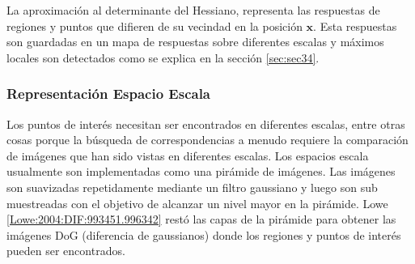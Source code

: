 


La aproximación al determinante del Hessiano, representa las respuestas de regiones y puntos que difieren de su vecindad en la posición $\mathbf{x}$. Esta respuestas son guardadas en un mapa de respuestas sobre diferentes escalas y máximos locales son detectados como se explica en la sección \ref{sec:sec34}.
% 

\subsubsection{Representación Espacio Escala}
\label{sec:section33}
Los puntos de interés necesitan ser encontrados en diferentes escalas, entre otras cosas porque la búsqueda de correspondencias a menudo requiere la comparación de imágenes que han sido vistas en diferentes escalas. Los espacios escala usualmente son implementadas como una pirámide de imágenes. Las imágenes son suavizadas repetidamente mediante un filtro gaussiano y luego son sub muestreadas con el objetivo de alcanzar un nivel mayor en la pirámide. Lowe \ref{Lowe:2004:DIF:993451.996342} restó las capas de la pirámide para obtener las imágenes DoG (diferencia de gaussianos) donde los regiones y puntos de interés pueden ser encontrados.

